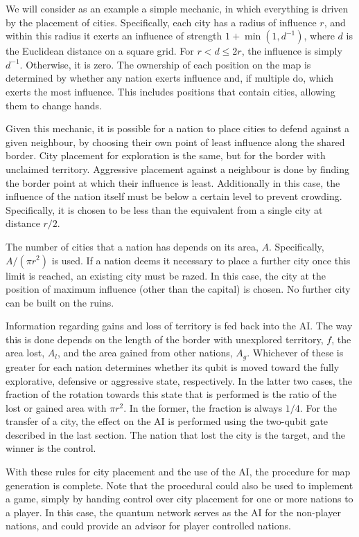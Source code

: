 \documentclass[conference]{IEEEtran}
\begin{document}
We will consider as an example a simple mechanic, in which everything is driven by the placement of cities. Specifically, each city has a radius of influence $r$, and within this radius it exerts an influence of strength $1+\min(1,d^{-1})$, where $d$ is the Euclidean distance on a square grid. For $ r< d \leq 2r$, the influence is simply $d^{-1}$. Otherwise, it is zero. The ownership of each position on the map is determined by whether any nation exerts influence and, if multiple do, which exerts the most influence. This includes positions that contain cities, allowing them to change hands.

Given this mechanic, it is possible for a nation to place cities to defend against a given neighbour, by choosing their own point of least influence along the shared border. City placement for exploration is the same, but for the border with unclaimed territory. Aggressive placement against a neighbour is done by finding the border point at which their influence is least. Additionally in this case, the influence of the nation itself must be below a certain level to prevent crowding. Specifically, it is chosen to be less than the equivalent from a single city at distance $r/2$.

The number of cities that a nation has depends on its area, $A$. Specifically, $A/(\pi r^2)$ is used. If a nation deems it necessary to place a further city once this limit is reached, an existing city must be razed. In this case, the city at the position of maximum influence (other than the capital) is chosen. No further city can be built on the ruins.

Information regarding gains and loss of territory is fed back into the AI. The way this is done depends on the length of the border with unexplored territory, $f$, the area lost, $A_{l}$, and the area gained from other nations, $A_{g}$. Whichever of these is greater for each nation determines whether its qubit is moved toward the fully explorative, defensive or aggressive state, respectively. In the latter two cases, the fraction of the rotation towards this state that is performed is the ratio of the lost or gained area with $\pi r^2$. In the former, the fraction is always $1/4$. For the transfer of a city, the effect on the AI is performed using the two-qubit gate described in the last section. The nation that lost the city is the target, and the winner is the control.

With these rules for city placement and the use of the AI, the procedure for map generation is complete. Note that the procedural could also be used to implement a game, simply by handing control over city placement for one or more nations to a player. In this case, the quantum network serves as the AI for the non-player nations, and could provide an advisor for player controlled nations.
\end{document}
